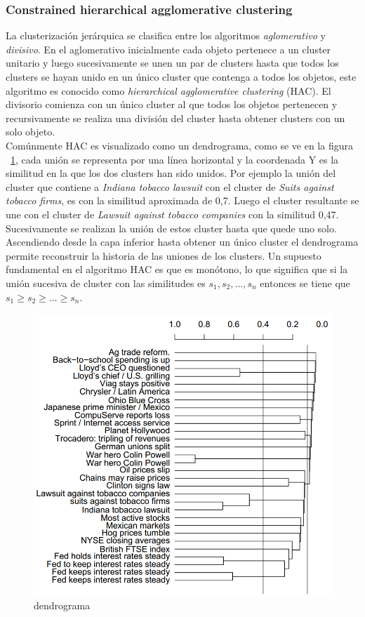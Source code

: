 \subsubsection{Constrained hierarchical agglomerative clustering}
La clusterización jerárquica se clasifica entre los algoritmos \textit{aglomerativo} y \textit{divisivo}. En el aglomerativo inicialmente cada objeto pertenece a un cluster unitario y luego sucesivamente se unen un par de clusters hasta que todos los clusters se hayan unido en un único cluster que contenga a todos los objetos, este algoritmo es conocido como \textit{hierarchical agglomerative clustering} (HAC). El divisorio comienza con un único cluster al que todos los objetos pertenecen y recursivamente se realiza una división del cluster hasta obtener clusters con un solo objeto.\\
Comúnmente HAC es visualizado como un dendrograma, como se ve en la figura ~\ref{des:Dendrogram}, cada unión se representa por una línea horizontal y la coordenada Y es la similitud en la que los dos clusters han sido unidos. Por ejemplo la unión del cluster que contiene a \textit{Indiana tobacco lawsuit} con el cluster de \textit{Suits against tobacco firms}, es con la similitud aproximada de 0,7. Luego el cluster resultante se une con el cluster de \textit{Lawsuit against tobacco companies} con la similitud 0,47. Sucesivamente se realizan la unión de estos cluster hasta que quede uno solo.\\
Ascendiendo desde la capa inferior hasta obtener un único cluster el dendrograma permite reconstruir la historia de las uniones de los clusters. Un supuesto fundamental en el algoritmo HAC es que es monótono, lo que significa que si la unión sucesiva de cluster con las similitudes es $s_1,s_2,\ldots,s_n$ entonces se tiene que $s_1 \geq s_2 \geq \ldots \geq s_n$.\\

\begin{figure}[H]
  \centering
    \includegraphics[width=1\textwidth]{img/Dendrogram.png}
  \caption{dendrograma}
  \label{des:Dendrogram}
\end{figure}

